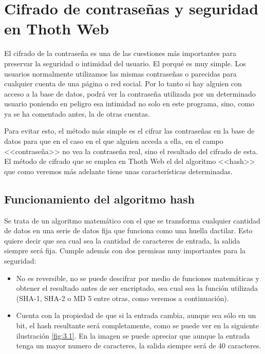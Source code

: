 \section{Cifrado de contraseñas y seguridad en Thoth Web}

El cifrado de la contraseña es una de las cuestiones más importantes para preservar la seguridad o intimidad del usuario. El porqué es muy simple. Los usuarios normalmente utilizamos las mismas contraseñas o parecidas para cualquier cuenta de una página o red social. Por lo tanto si hay alguien con acceso a la base de datos, podrá ver la contraseña utilizada por un determinado usuario poniendo en peligro esa intimidad no solo en este programa, sino, como ya se ha comentado antes, la de otras cuentas.

Para evitar esto, el método más simple es el cifrar las contraseñas en la base de datos para que en el caso en el que alguien acceda a ella, en el campo <<contraseña>> no vea la contraseña real, sino el resultado del cifrado de esta. El método de cifrado que se emplea en Thoth Web el del algoritmo <<hash>> que como veremos más adelante tiene unas características determinadas. 

\subsection{Funcionamiento del algoritmo hash}

Se trata de un algoritmo matemático con el que se transforma cualquier cantidad de datos en una serie de datos fija que funciona como una huella dactilar. Esto quiere decir que sea cual sea la cantidad de caracteres de entrada, la salida siempre será fija. Cumple además con dos premisas muy importantes para la seguridad: 

\begin{itemize}
\item No es reversible, no se puede descifrar por medio de funciones matemáticas y obtener el resultado antes de ser encriptado, sea cual sea la función utilizada (SHA-1, SHA-2 o MD 5 entre otras, como veremos a continuación).
\item Cuenta con la propiedad de que si la entrada cambia, aunque sea sólo en un bit, el hash resultante será completamente, como se puede ver en la siguiente ilustración \ref{fig:3.1}. En la imagen se puede apreciar que aunque la entrada tenga un mayor numero de caracteres, la salida siempre será de 40 caracteres.

\end{itemize} 


